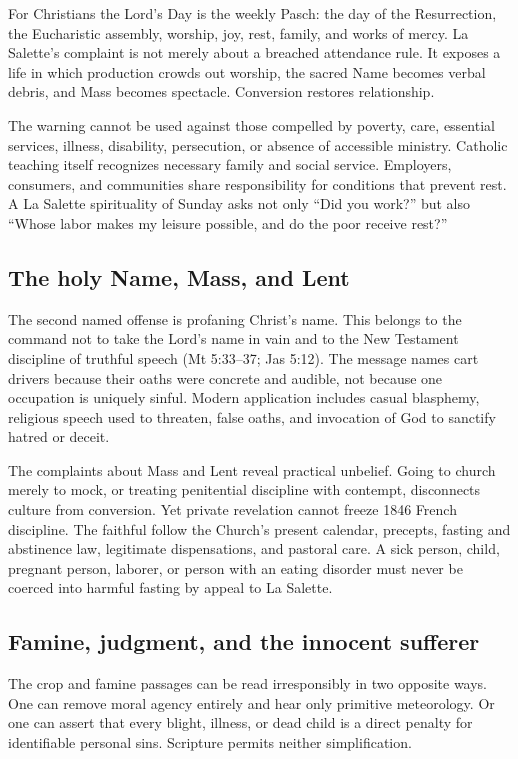 For Christians the Lord's Day is the weekly Pasch: the day of the Resurrection, the Eucharistic assembly, worship, joy, rest, family, and works of mercy. La Salette's complaint is not merely about a breached attendance rule. It exposes a life in which production crowds out worship, the sacred Name becomes verbal debris, and Mass becomes spectacle. Conversion restores relationship.

The warning cannot be used against those compelled by poverty, care, essential services, illness, disability, persecution, or absence of accessible ministry. Catholic teaching itself recognizes necessary family and social service. Employers, consumers, and communities share responsibility for conditions that prevent rest. A La Salette spirituality of Sunday asks not only ``Did you work?'' but also ``Whose labor makes my leisure possible, and do the poor receive rest?''

\subsection{The holy Name, Mass, and Lent}

The second named offense is profaning Christ's name. This belongs to the command not to take the Lord's name in vain and to the New Testament discipline of truthful speech (Mt 5:33--37; Jas 5:12). The message names cart drivers because their oaths were concrete and audible, not because one occupation is uniquely sinful. Modern application includes casual blasphemy, religious speech used to threaten, false oaths, and invocation of God to sanctify hatred or deceit.

The complaints about Mass and Lent reveal practical unbelief. Going to church merely to mock, or treating penitential discipline with contempt, disconnects culture from conversion. Yet private revelation cannot freeze 1846 French discipline. The faithful follow the Church's present calendar, precepts, fasting and abstinence law, legitimate dispensations, and pastoral care. A sick person, child, pregnant person, laborer, or person with an eating disorder must never be coerced into harmful fasting by appeal to La Salette.

\subsection{Famine, judgment, and the innocent sufferer}

The crop and famine passages can be read irresponsibly in two opposite ways. One can remove moral agency entirely and hear only primitive meteorology. Or one can assert that every blight, illness, or dead child is a direct penalty for identifiable personal sins. Scripture permits neither simplification.

